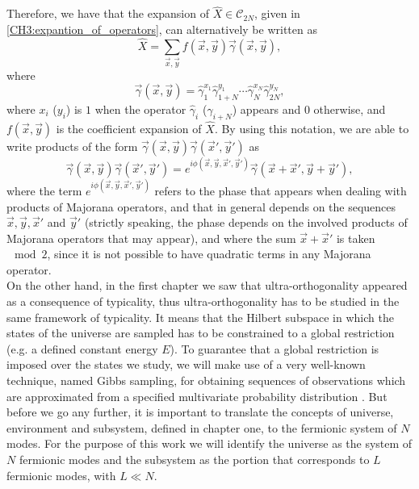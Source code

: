 Therefore, we have that the expansion of $\hat{X}\in \mathcal{C}_{2N}$, given in \eqref{CH3:expantion_of_operators}, can alternatively be written as
\begin{equation}
\hat{X} = \sum_{\vec{x},\vec{y}} f(\vec{x},\vec{y}) \vec{\gamma}(\vec{x},\vec{y}),
\label{CH3:expantion_operator_X}
\end{equation}
where
\begin{equation}
\vec{\gamma}(\vec{x},\vec{y}) = \hat{\gamma}_{1}^{x_1}\hat{\gamma}_{1+N}^{y_1}\cdots \hat{\gamma}_{N}^{x_N}\hat{\gamma}_{2N}^{y_N},
\end{equation}
where $x_i$ ($y_i$) is $1$ when the operator $\hat{\gamma}_i$ ($\hat{\gamma}_{i+N}$) appears and $0$ otherwise, and $f(\vec{x},\vec{y})$ is the coefficient expansion of $\hat{X}$.  By using this notation, we are able to write products of the form $\vec{\gamma}(\vec{x},\vec{y})\vec{\gamma}(\vec{x}',\vec{y}')$ as
\begin{equation}
\vec{\gamma}(\vec{x},\vec{y})\vec{\gamma}(\vec{x}',\vec{y}') = e^{i\phi(\vec{x},\vec{y},\vec{x}',\vec{y}')} \vec{\gamma}(\vec{x}+\vec{x}',\vec{y}+\vec{y}'),
\label{CH3:relation_vectors}
\end{equation}
where the term $e^{i\phi(\vec{x},\vec{y},\vec{x}',\vec{y}')}$ refers to the phase that appears when dealing with products of Majorana operators, and that in general depends on the sequences $\vec{x},\vec{y},\vec{x}'$ and $\vec{y}'$ (strictly speaking, the phase depends on the involved products of Majorana operators that may appear), and where the sum $\vec{x}+\vec{x}'$ is taken $\mod 2$, since it is not possible to have quadratic terms in any Majorana operator\cite{bravyi_lagrangian_2004}.\\


\indent On the other hand, in the first chapter we saw that ultra-orthogonality appeared as a consequence of typicality, thus ultra-orthogonality has to be studied in the same framework of typicality. It means that the Hilbert subspace in which the states of the universe are sampled has to be constrained to a global restriction (e.g. a defined constant energy $E$). To guarantee that a global restriction is imposed over the states we study, we will make use of a very well-known technique, named Gibbs sampling, for obtaining sequences of observations which are approximated from a specified multivariate probability distribution \cite{robert_multi-stage_2004, gilks_markov_1996, noauthor_gibbs_nodate}. But before we go any further, it is important to translate the concepts of universe, environment and subsystem, defined in chapter one, to the fermionic system of $N$ modes. For the purpose of this work we will identify the universe as the system of $N$ fermionic modes and the subsystem as the portion that corresponds to $L$ fermionic modes, with $L \ll N$.\\

